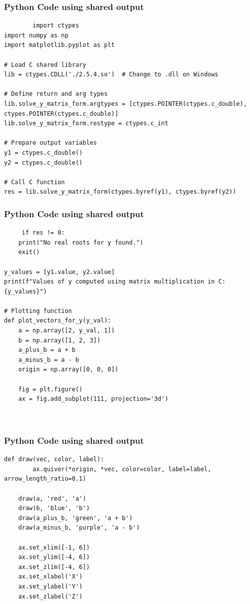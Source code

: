 \documentclass{beamer}
\begin{document}
\begin{frame}[fragile]
	\frametitle{Python Code using shared output}
	\begin{lstlisting}
		import ctypes
import numpy as np
import matplotlib.pyplot as plt

# Load C shared library
lib = ctypes.CDLL('./2.5.4.so')  # Change to .dll on Windows

# Define return and arg types
lib.solve_y_matrix_form.argtypes = [ctypes.POINTER(ctypes.c_double), ctypes.POINTER(ctypes.c_double)]
lib.solve_y_matrix_form.restype = ctypes.c_int

# Prepare output variables
y1 = ctypes.c_double()
y2 = ctypes.c_double()

# Call C function
res = lib.solve_y_matrix_form(ctypes.byref(y1), ctypes.byref(y2))

	\end{lstlisting}
\end{frame}
\begin{frame}[fragile]
	\frametitle{Python Code using shared output}
	\begin{lstlisting}	
     if res != 0:
    print("No real roots for y found.")
    exit()

y_values = [y1.value, y2.value]
print(f"Values of y computed using matrix multiplication in C: {y_values}")

# Plotting function
def plot_vectors_for_y(y_val):
    a = np.array([2, y_val, 1])
    b = np.array([1, 2, 3])
    a_plus_b = a + b
    a_minus_b = a - b
    origin = np.array([0, 0, 0])

    fig = plt.figure()
    ax = fig.add_subplot(111, projection='3d')

    
	\end{lstlisting}
\end{frame}
\begin{frame}[fragile]
	\frametitle{Python Code using shared output}
	\begin{lstlisting}
def draw(vec, color, label):
        ax.quiver(*origin, *vec, color=color, label=label, arrow_length_ratio=0.1)

    draw(a, 'red', 'a')
    draw(b, 'blue', 'b')
    draw(a_plus_b, 'green', 'a + b')
    draw(a_minus_b, 'purple', 'a - b')

    ax.set_xlim([-1, 6])
    ax.set_ylim([-4, 6])
    ax.set_zlim([-4, 6])
    ax.set_xlabel('X')
    ax.set_ylabel('Y')
    ax.set_zlabel('Z')
    

	\end{lstlisting}
\end{frame}
\end{document}
